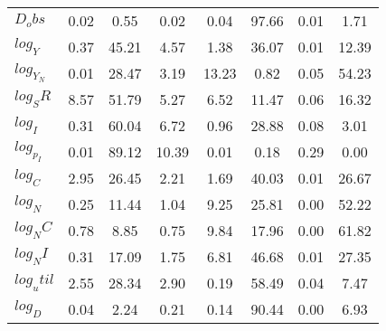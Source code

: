 \begin{center}
\begin{longtable}{lccccccc}
$D_obs     $	 & 	        0.02	 & 	        0.55	 & 	        0.02	 & 	        0.04	 & 	       97.66	 & 	        0.01	 & 	        1.71 \\ 
$log_Y     $	 & 	        0.37	 & 	       45.21	 & 	        4.57	 & 	        1.38	 & 	       36.07	 & 	        0.01	 & 	       12.39 \\ 
$log_Y_N   $	 & 	        0.01	 & 	       28.47	 & 	        3.19	 & 	       13.23	 & 	        0.82	 & 	        0.05	 & 	       54.23 \\ 
$log_SR    $	 & 	        8.57	 & 	       51.79	 & 	        5.27	 & 	        6.52	 & 	       11.47	 & 	        0.06	 & 	       16.32 \\ 
$log_I     $	 & 	        0.31	 & 	       60.04	 & 	        6.72	 & 	        0.96	 & 	       28.88	 & 	        0.08	 & 	        3.01 \\ 
$log_p_I   $	 & 	        0.01	 & 	       89.12	 & 	       10.39	 & 	        0.01	 & 	        0.18	 & 	        0.29	 & 	        0.00 \\ 
$log_C     $	 & 	        2.95	 & 	       26.45	 & 	        2.21	 & 	        1.69	 & 	       40.03	 & 	        0.01	 & 	       26.67 \\ 
$log_N     $	 & 	        0.25	 & 	       11.44	 & 	        1.04	 & 	        9.25	 & 	       25.81	 & 	        0.00	 & 	       52.22 \\ 
$log_NC    $	 & 	        0.78	 & 	        8.85	 & 	        0.75	 & 	        9.84	 & 	       17.96	 & 	        0.00	 & 	       61.82 \\ 
$log_NI    $	 & 	        0.31	 & 	       17.09	 & 	        1.75	 & 	        6.81	 & 	       46.68	 & 	        0.01	 & 	       27.35 \\ 
$log_util  $	 & 	        2.55	 & 	       28.34	 & 	        2.90	 & 	        0.19	 & 	       58.49	 & 	        0.04	 & 	        7.47 \\ 
$log_D     $	 & 	        0.04	 & 	        2.24	 & 	        0.21	 & 	        0.14	 & 	       90.44	 & 	        0.00	 & 	        6.93 \\ 
\end{longtable}
 \end{center}
